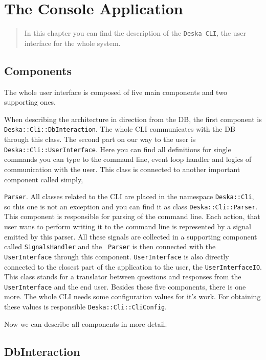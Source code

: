 \documentclass[deska]{subfiles}
\begin{document}
\chapter{The Console Application}
\label{sec:cli-app}

\begin{abstract}

In this chapter you can find the description of the {\tt Deska CLI}, the user interface for the whole system.

\end{abstract}

\section{Components}

The whole user interface is composed of five main components and two supporting ones.

When describing the architecture in direction from the DB, the first component is {\tt Deska::Cli::DbInteraction}. The 
whole CLI communicates with the DB through this class. The second part on our way to the user is {\tt 
Deska::Cli::UserInterface}. Here you can find all definitions for single commands you can type to the command line, 
event loop handler and logics of communication with the user. This class is connected to another important component 
called simply,

{\tt Parser}. All classes related to the CLI are placed in the namespace {\tt Deska::Cli}, so this one is not an 
exception and you can find it as class {\tt Deska::Cli::Parser}. This component is responsible for parsing of the 
command line. Each action, that user wans to perform writing it to the command line is represented by a signal emitted 
by this parser. All these signals are collected in a supporting component called {\tt SignalsHandler} and the {\tt 
Parser} is then connected with the {\tt UserInterface} through this component. {\tt UserInterface} is also directly 
connected to the closest part of the application to the user, the {\tt UserInterfaceIO}. This class stands for a 
translator between questions and responses from the {\tt UserInterface} and the end user. Besides these five 
components, there is one more. The whole CLI needs some configuration values for it's work. For obtaining these values 
is responsible {\tt Deska::Cli::CliConfig}.

Now we can describe all components in more detail.

\section{DbInteraction}
\end{document}
